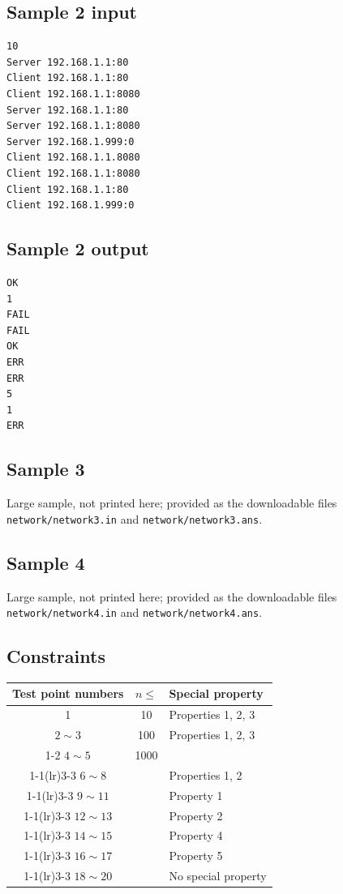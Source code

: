 \documentclass[11pt]{article}
\begin{document}
\subsection*{Sample 2 input}

\begin{verbatim}
10
Server 192.168.1.1:80
Client 192.168.1.1:80
Client 192.168.1.1:8080
Server 192.168.1.1:80
Server 192.168.1.1:8080
Server 192.168.1.999:0
Client 192.168.1.1.8080
Client 192.168.1.1:8080
Client 192.168.1.1:80
Client 192.168.1.999:0
\end{verbatim}

\subsection*{Sample 2 output}

\begin{verbatim}
OK
1
FAIL
FAIL
OK
ERR
ERR
5
1
ERR
\end{verbatim}

\subsection*{Sample 3}

Large sample, not printed here;
provided as the downloadable files \texttt{network/network3.in} and \texttt{network/network3.ans}.

\subsection*{Sample 4}

Large sample, not printed here;
provided as the downloadable files \texttt{network/network4.in} and \texttt{network/network4.ans}.

\subsection*{Constraints}

\begin{center}
\begin{tabular}{ccl}
\toprule
Test point numbers & $n \le$ & Special property \\
\midrule
1           & 10   & Properties 1, 2, 3 \\
\midrule
$2 \sim 3$  & 100  & Properties 1, 2, 3 \\
\cmidrule(lr){1-2}
$4 \sim 5$  & 1000 & \\
\cmidrule(lr){1-1}\cmidrule(lr){3-3}
$6 \sim 8$  &      & Properties 1, 2 \\
\cmidrule(lr){1-1}\cmidrule(lr){3-3}
$9 \sim 11$ &      & Property 1 \\
\cmidrule(lr){1-1}\cmidrule(lr){3-3}
$12 \sim 13$ &     & Property 2 \\
\cmidrule(lr){1-1}\cmidrule(lr){3-3}
$14 \sim 15$ &     & Property 4 \\
\cmidrule(lr){1-1}\cmidrule(lr){3-3}
$16 \sim 17$ &     & Property 5 \\
\cmidrule(lr){1-1}\cmidrule(lr){3-3}
$18 \sim 20$ &     & No special property \\
\bottomrule
\end{tabular}
\end{center}
\end{document}
